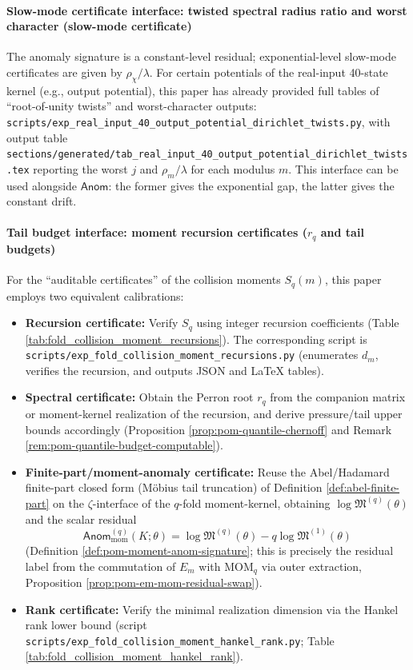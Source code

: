 \paragraph{Slow-mode certificate interface: twisted spectral radius ratio and worst character (slow-mode certificate)}
The anomaly signature is a constant-level residual; exponential-level slow-mode certificates are given by \(\rho_\chi/\lambda\).
For certain potentials of the real-input 40-state kernel (e.g., output potential), this paper has already provided full tables of ``root-of-unity twists'' and worst-character outputs:
\texttt{scripts/exp\_real\_input\_40\_output\_potential\_dirichlet\_twists.py},
with output table \texttt{sections/generated/tab\_real\_input\_40\_output\_potential\_dirichlet\_twists.tex}
reporting the worst \(j\) and \(\rho_m/\lambda\) for each modulus \(m\).
This interface can be used alongside \(\mathsf{Anom}\): the former gives the exponential gap, the latter gives the constant drift.

\paragraph{Tail budget interface: moment recursion certificates (\texorpdfstring{$r_q$}{rq} and tail budgets)}
For the ``auditable certificates'' of the collision moments \(S_q(m)\), this paper employs two equivalent calibrations:
\begin{itemize}
  \item \textbf{Recursion certificate:} Verify \(S_q\) using integer recursion coefficients (Table \ref{tab:fold_collision_moment_recursions}).
  The corresponding script is \texttt{scripts/exp\_fold\_collision\_moment\_recursions.py} (enumerates \(d_m\), verifies the recursion, and outputs JSON and LaTeX tables).
  \item \textbf{Spectral certificate:} Obtain the Perron root \(r_q\) from the companion matrix or moment-kernel realization of the recursion, and derive pressure/tail upper bounds accordingly (Proposition \ref{prop:pom-quantile-chernoff} and Remark \ref{rem:pom-quantile-budget-computable}).
  \item \textbf{Finite-part/moment-anomaly certificate:} Reuse the Abel/Hadamard finite-part closed form (M\"obius tail truncation) of Definition \ref{def:abel-finite-part} on the \(\zeta\)-interface of the \(q\)-fold moment-kernel, obtaining \(\log\mathfrak{M}^{(q)}(\theta)\) and the scalar residual
  \[
  \mathsf{Anom}^{(q)}_{\mathrm{mom}}(K;\theta)=\log\mathfrak{M}^{(q)}(\theta)-q\log\mathfrak{M}^{(1)}(\theta)
  \]
  (Definition \ref{def:pom-moment-anom-signature}; this is precisely the residual label from the commutation of \(E_m\) with \(\mathrm{MOM}_q\) via outer extraction, Proposition \ref{prop:pom-em-mom-residual-swap}).
  \item \textbf{Rank certificate:} Verify the minimal realization dimension via the Hankel rank lower bound (script \texttt{scripts/exp\_fold\_collision\_moment\_hankel\_rank.py}; Table \ref{tab:fold_collision_moment_hankel_rank}).
  \end{itemize}

